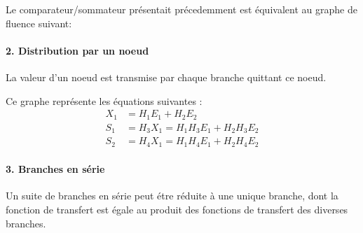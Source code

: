 Le comparateur/sommateur présentait précedemment est équivalent au graphe 
de fluence suivant:

\begin{center}
\end{center}

\paragraph{2. Distribution par un noeud}

La valeur d'un noeud est transmise par chaque branche quittant ce noeud.
\begin{center}
\end{center}

Ce graphe représente les équations suivantes :
\begin{align*}
    X_1&=H_1E_1+H_2E_2\\
    S_1&=H_3X_1=H_1H_3E_1+H_2H_3E_2\\
    S_2&=H_4X_1=H_1H_4E_1+H_2H_4E_2
\end{align*}


\paragraph{3. Branches en série}
Un suite de branches en série peut étre réduite à une unique branche, dont la fonction de transfert est égale 
au produit des fonctions de transfert des diverses branches.

